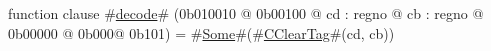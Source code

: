 function clause #\hyperref[zdecode]{decode}# (0b010010 @ 0b00100 @ cd : regno @ cb : regno @ 0b00000 @ 0b000@ 0b101)    = #\hyperref[zSome]{Some}#(#\hyperref[zCClearTag]{CClearTag}#(cd, cb))
